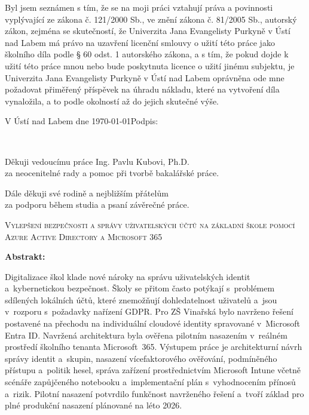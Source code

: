 \documentclass[male,czech,api_bc]{kitheses}
\newcommand{\nazevcz}{Vylepšení bezpečnosti a správy uživatelských účtů na základní škole pomocí Azure Active Directory a Microsoft 365}     %
\newcommand{\vedouciDAT}{Ing. Pavlu Kubovi, Ph.D.}
\begin{document}
Byl jsem seznámen 
s tím, že se na moji práci vztahují práva a povinnosti vyplývající ze
zákona č. 121/2000 Sb., ve znění zákona č. 81/2005 Sb., autorský zákon, zejména se
skutečností, že Univerzita Jana Evangelisty Purkyně v Ústí nad Labem má právo na uzavření
licenční smlouvy o užití této práce jako školního díla podle § 60 odst. 1 autorského zákona, a
s tím, že pokud dojde k užití této práce mnou nebo bude poskytnuta licence o užití jinému
subjektu, je Univerzita Jana Evangelisty Purkyně v Ústí nad Labem oprávněna ode mne
požadovat přiměřený příspěvek na úhradu nákladu, které na vytvoření díla vynaložila, a to
podle okolností až do jejich skutečné výše.

\vspace{2em}

V Ústí nad Labem dne \today   \hfill Podpis: \makebox[4cm][s]{\dotfill}

\cleardoublepage
\thispagestyle{empty}
~
\vfill

\begin{flushright}
    Děkuji vedoucímu práce {\vedouciDAT}\\
    za neocenitelné rady a pomoc při tvorbě bakalářské práce.
    
    Dále děkuji své rodině a nejbližším přátelům\\
    za podporu během studia a psaní závěrečné práce.
\end{flushright}

\cleardoublepage

\textsc{\nazevcz}

\textbf{Abstrakt:}

Digitalizace škol klade nové nároky na správu uživatelských identit a~kybernetickou bezpečnost. Školy se přitom často potýkají s~problémem sdílených lokálních účtů, které znemožňují dohledatelnost uživatelů a~jsou v~rozporu s~požadavky nařízení GDPR.
Pro ZŠ Vinařská bylo navrženo řešení postavené na přechodu na individuální cloudové identity spravované v~Microsoft Entra ID. Navržená architektura byla ověřena pilotním nasazením v~reálném prostředí školního tenanta Microsoft~365.
Výstupem práce je architekturní návrh správy identit a~skupin, nasazení vícefaktorového ověřování, podmíněného přístupu a~politik hesel, správa zařízení prostřednictvím Microsoft Intune včetně scénáře zapůjčeného notebooku a~implementační plán s~vyhodnocením přínosů a~rizik.
Pilotní nasazení potvrdilo funkčnost navrženého řešení a~tvoří základ pro plné produkční nasazení plánované na léto 2026.
\end{document}
